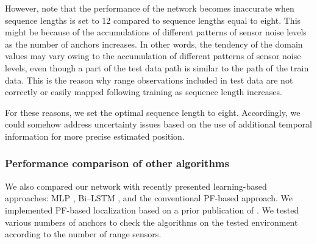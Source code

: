 \documentclass[letterpaper, 10 pt, conference]{ieeeconf}
\begin{document}
However, note that the performance of the network becomes inaccurate when sequence lengths is set to 12 compared to sequence lengths equal to eight. This might be because of the accumulations of different patterns of sensor noise levels as the number of anchors increases. In other words, the tendency of the domain values may vary owing to the accumulation of different patterns of sensor noise levels, even though a part of the test data path is similar to the path of the train data. This is the reason why range observations included in test data are not correctly or easily mapped following training as sequence length increases.


For these reasons, we set the optimal sequence length to eight. Accordingly, we could somehow address uncertainty issues based on the use of additional temporal information for more precise estimated position.






\subsubsection{Performance comparison of other algorithms}

We also compared our network with recently presented learning-based approaches: MLP \cite{kumar2016localization}, Bi--LSTM \cite{lim2018effective}, and the conventional PF-based approach\cite{gonzalez2009mobile, blanco2008pure}. We implemented PF-based localization based on a prior publication of \cite{gonzalez2009mobile}. We tested various numbers of anchors to check the algorithms on the tested environment according to the number of range sensors.
\end{document}
